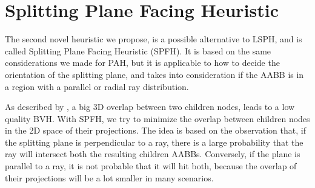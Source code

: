 \documentclass[11pt,a4paper,twocolumn]{article}
\begin{document}
\section{Splitting Plane Facing Heuristic}
The second novel heuristic we propose, is a possible alternative to LSPH, and is called Splitting Plane Facing Heuristic (SPFH). It is based on the same considerations we made for PAH, but it is applicable to how to decide the orientation of the splitting plane, and takes into consideration if the AABB is in a region with a parallel or radial ray distribution.

As described by \cite{bvh_overlapping_metric}, a big 3D overlap between two children nodes, leads to a low quality BVH. With SPFH, we try to minimize the overlap between children nodes in the 2D space of their projections. The idea is based on the observation that, if the splitting plane is perpendicular to a ray, there is a large probability that the ray will intersect both the resulting children AABBs. Conversely, if the plane is parallel to a ray, it is not probable that it will hit both, because the overlap of their projections will be a lot smaller in many scenarios.
\end{document}
